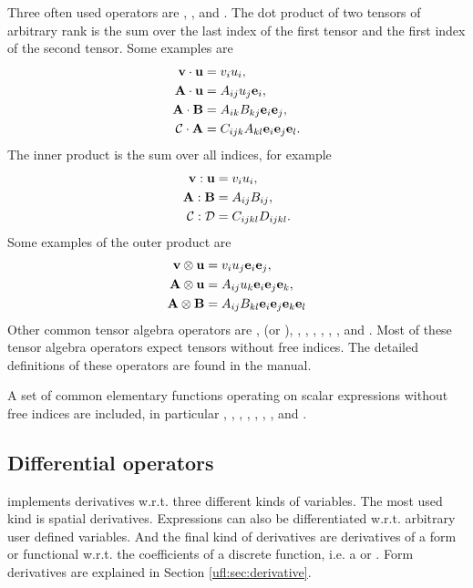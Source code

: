 Three often used operators are , ,
and .  The dot product of two tensors of arbitrary
rank is the sum over the last index of the first tensor and the first
index of the second tensor.  Some examples are
\begin{align}
\mathbf{v} \cdot \mathbf{u} &= v_i u_i, \\
\mathbf{A} \cdot \mathbf{u} &= A_{ij} u_j \mathbf{e}_i, \\
\mathbf{A} \cdot \mathbf{B} &= A_{ik} B_{kj} \mathbf{e}_i \mathbf{e}_j, \\
\mathcal{C} \cdot \mathbf{A} &= C_{ijk} A_{kl} \mathbf{e}_i \mathbf{e}_j \mathbf{e}_l.
\end{align}
The inner product is the sum over all indices, for example
\begin{align}
\mathbf{v} : \mathbf{u} &= v_i u_i, \\
\mathbf{A} : \mathbf{B} &= A_{ij} B_{ij}, \\
\mathcal{C} : \mathcal{D} &= C_{ijkl} D_{ijkl}.
\end{align}
Some examples of the outer product are
\begin{align}
\mathbf{v} \otimes \mathbf{u} &= v_i u_j \mathbf{e}_i \mathbf{e}_j, \\
\mathbf{A} \otimes \mathbf{u} &= A_{ij} u_k \mathbf{e}_i \mathbf{e}_j \mathbf{e}_k, \\
\mathbf{A} \otimes \mathbf{B} &= A_{ij} B_{kl} \mathbf{e}_i \mathbf{e}_j \mathbf{e}_k \mathbf{e}_l
\end{align}
Other common tensor algebra operators are ,
 (or ), , ,
, , , , and
. Most of these tensor algebra operators expect tensors
without free indices. The detailed definitions of these operators are
found in the manual.

A set of common elementary functions operating on scalar expressions
without free indices are included, in particular ,
, , , ,
, , and .

\subsection{Differential operators} \label{ufl:sec:differential}
\index{$\nabla$}

\ufl{} implements derivatives w.r.t. three different kinds of
variables.  The most used kind is spatial derivatives.  Expressions
can also be differentiated w.r.t. arbitrary user defined variables.
And the final kind of derivatives are derivatives of a form or
functional w.r.t. the coefficients of a discrete function, i.e. a
 or .  Form derivatives are
explained in Section \ref{ufl:sec:derivative}.

